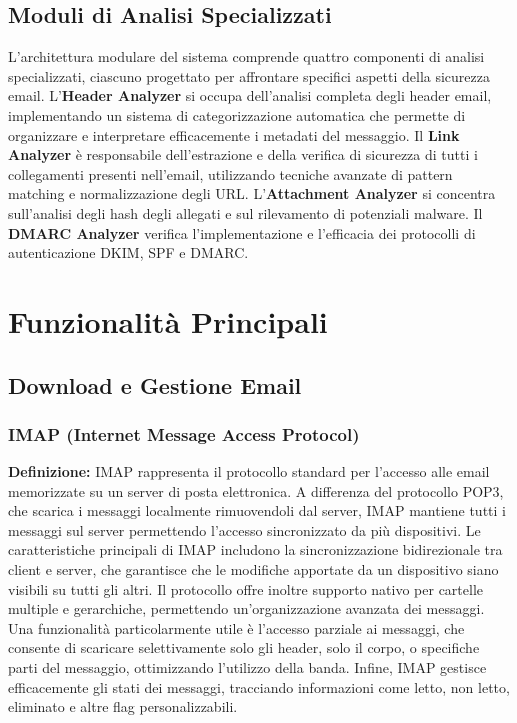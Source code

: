 \documentclass{article}
\begin{document}
\subsection{Moduli di Analisi Specializzati}

L'architettura modulare del sistema comprende quattro componenti di analisi specializzati, ciascuno progettato per affrontare specifici aspetti della sicurezza email.
\newline\newline
L'\textbf{Header Analyzer} si occupa dell'analisi completa degli header email, implementando un sistema di categorizzazione automatica che permette di organizzare e interpretare efficacemente i metadati del messaggio.
\newline\newline
Il \textbf{Link Analyzer} è responsabile dell'estrazione e della verifica di sicurezza di tutti i collegamenti presenti nell'email, utilizzando tecniche avanzate di pattern matching e normalizzazione degli URL.\newline\newline 
L'\textbf{Attachment Analyzer} si concentra sull'analisi degli hash degli allegati e sul rilevamento di potenziali malware. \newline\newline
Il \textbf{DMARC Analyzer} verifica l'implementazione e l'efficacia dei protocolli di autenticazione DKIM, SPF e DMARC.

\section{Funzionalità Principali}

\subsection{Download e Gestione Email}

\subsubsection{IMAP (Internet Message Access Protocol)}
\textbf{Definizione:} IMAP rappresenta il protocollo standard per l'accesso alle email memorizzate su un server di posta elettronica. A differenza del protocollo POP3, che scarica i messaggi localmente rimuovendoli dal server, IMAP mantiene tutti i messaggi sul server permettendo l'accesso sincronizzato da più dispositivi.
\newline\newline
Le caratteristiche principali di IMAP includono la sincronizzazione bidirezionale tra client e server, che garantisce che le modifiche apportate da un dispositivo siano visibili su tutti gli altri. Il protocollo offre inoltre supporto nativo per cartelle multiple e gerarchiche, permettendo un'organizzazione avanzata dei messaggi. Una funzionalità particolarmente utile è l'accesso parziale ai messaggi, che consente di scaricare selettivamente solo gli header, solo il corpo, o specifiche parti del messaggio, ottimizzando l'utilizzo della banda. Infine, IMAP gestisce efficacemente gli stati dei messaggi, tracciando informazioni come letto, non letto, eliminato e altre flag personalizzabili.
\end{document}
